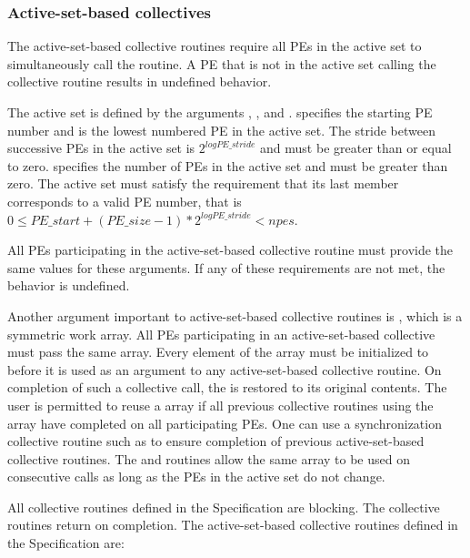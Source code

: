 \begin{DeprecateBlock}

\subsubsection*{Active-set-based collectives}

The active-set-based collective routines require all \acp{PE}
in the active set to simultaneously call the
routine.  A \ac{PE} that is not in the active set calling the collective
routine results in undefined behavior.

The active set is defined by the arguments , ,
and .   specifies the starting \ac{PE} number and
is the lowest numbered \ac{PE} in the active set.  The stride between successive
\acp{PE} in the active set is $2^{logPE\_stride}$ and  must
be greater than or equal to zero.   specifies the number of
\acp{PE} in the active set and must be greater than zero.  The active set must
satisfy the requirement that its last member corresponds to a valid \ac{PE}
number, that is
$0 \le PE\_start + (PE\_size - 1) * 2^{logPE\_stride} < npes$.

All \acp{PE} participating in the active-set-based collective routine must provide the same
values for these arguments.  If any of these requirements are not met, the
behavior is undefined.

Another argument important to active-set-based collective routines is , which is a
symmetric work array.  All \acp{PE} participating in an active-set-based collective must pass the
same  array.
Every element of the  array must be initialized to
 before it is used as an argument to
any active-set-based collective routine.
On completion of such a collective call, the  is
restored to its original contents.  The user is permitted to reuse a 
array if all previous collective routines using the  array have
completed on all participating \acp{PE}. One can use a synchronization
collective routine such as  to ensure completion of previous active-set-based collective
routines. The  and  routines allow the same
 array to be used on consecutive calls as long as the \acp{PE}
in the active set do not change.

All collective routines defined in the Specification are blocking.  The
collective routines return on completion.  The active-set-based collective
routines defined in the \openshmem Specification are:


\end{DeprecateBlock}
